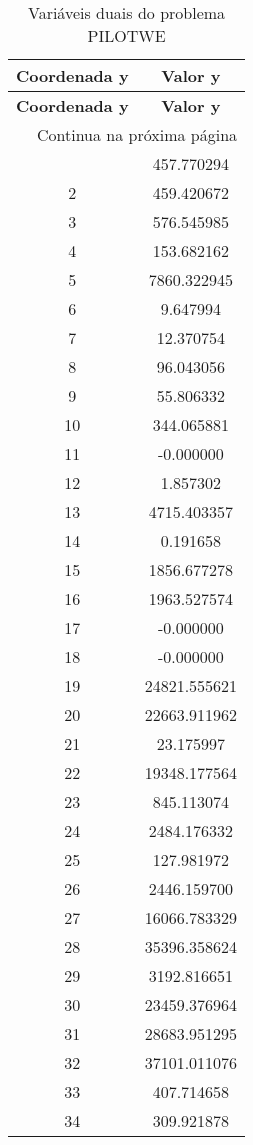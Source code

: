 \documentclass[12pt]{article}
\begin{document}
\begin{longtable}{@{}cc@{}}
\caption{Variáveis duais do problema PILOTWE} \\
\toprule
\textbf{Coordenada y} & \textbf{Valor y} \\
\midrule
\endfirsthead

\toprule
\textbf{Coordenada y} & \textbf{Valor y} \\
\midrule
\endhead

\midrule \multicolumn{2}{r}{{Continua na próxima página}} \\ \midrule
\endfoot

\bottomrule
\endlastfoot
1 & 457.770294 \\
2 & 459.420672 \\
3 & 576.545985 \\
4 & 153.682162 \\
5 & 7860.322945 \\
6 & 9.647994 \\
7 & 12.370754 \\
8 & 96.043056 \\
9 & 55.806332 \\
10 & 344.065881 \\
11 & -0.000000 \\
12 & 1.857302 \\
13 & 4715.403357 \\
14 & 0.191658 \\
15 & 1856.677278 \\
16 & 1963.527574 \\
17 & -0.000000 \\
18 & -0.000000 \\
19 & 24821.555621 \\
20 & 22663.911962 \\
21 & 23.175997 \\
22 & 19348.177564 \\
23 & 845.113074 \\
24 & 2484.176332 \\
25 & 127.981972 \\
26 & 2446.159700 \\
27 & 16066.783329 \\
28 & 35396.358624 \\
29 & 3192.816651 \\
30 & 23459.376964 \\
31 & 28683.951295 \\
32 & 37101.011076 \\
33 & 407.714658 \\
34 & 309.921878 \\

\end{longtable}
\end{document}
